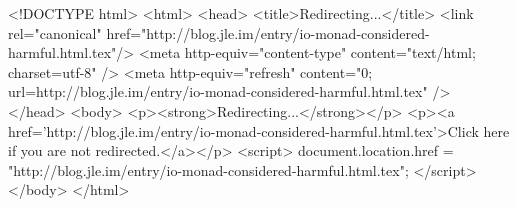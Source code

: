 <!DOCTYPE html>
<html>
<head>
<title>Redirecting...</title>
<link rel="canonical" href="http://blog.jle.im/entry/io-monad-considered-harmful.html.tex"/>
<meta http-equiv="content-type" content="text/html; charset=utf-8" />
<meta http-equiv="refresh" content="0; url=http://blog.jle.im/entry/io-monad-considered-harmful.html.tex" />
</head>
<body>
  <p><strong>Redirecting...</strong></p>
  <p><a href='http://blog.jle.im/entry/io-monad-considered-harmful.html.tex'>Click here if you are not redirected.</a></p>
  <script>
    document.location.href = "http://blog.jle.im/entry/io-monad-considered-harmful.html.tex";
  </script>
</body>
</html>
